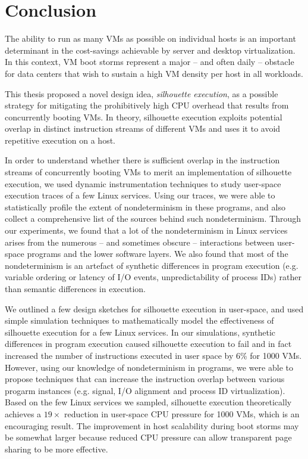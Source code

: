 \chapter{Conclusion} \label{ch:conc}
The ability to run as many VMs as possible
on individual hosts is an important determinant
in the cost-savings achievable
by server and desktop virtualization.
In this context, VM boot storms represent a major -- and often daily -- 
obstacle for data centers that wish to sustain a high VM density
per host in all workloads.

This thesis proposed a novel
design idea, {\em silhouette execution},
as a possible strategy for
mitigating the prohibitively high
CPU overhead that results from concurrently
booting VMs. In theory, silhouette execution 
exploits potential overlap in distinct instruction streams
of different VMs and uses it to avoid repetitive
execution on a host.

In order to understand whether
there is sufficient overlap in the instruction streams of
concurrently booting VMs to merit an implementation of 
silhouette execution, we used dynamic instrumentation 
techniques to study user-space execution traces of 
a few Linux services. Using our traces,
we were able to statistically profile
the extent of nondeterminism in these programs,
and also collect a comprehensive list of 
the sources behind such nondeterminism.
Through our experiments, we found that a
lot of the nondeterminism in Linux services
arises from the numerous -- and sometimes obscure --
interactions between user-space programs
and the lower software layers. We also
found that most of the nondeterminism
is an artefact of synthetic differences
in program execution (e.g. variable ordering
or latency of I/O events, unpredictability
of process IDs) rather than 
semantic differences in execution.

We outlined a few design sketches
for silhouette execution in user-space,
and used simple simulation techniques to
mathematically model the effectiveness of 
silhouette execution for a few Linux services. In
our simulations, synthetic differences in program execution
caused silhouette execution to fail and in fact
increased the number of instructions
executed in user space by 6\% for 1000 VMs.
However, using our knowledge of nondeterminism
in programs, we were able to propose
techniques that can increase
the instruction overlap 
between various progarm instances (e.g.
signal, I/O alignment and process ID virtualization).
Based on the few Linux services we sampled, silhouette execution
theoretically achieves a $19\times$ reduction
in user-space CPU pressure for 1000 VMs,
which is an encouraging result. 
The improvement in host scalability
during boot storms may be somewhat larger
because reduced CPU pressure can allow
transparent page sharing to be more
effective.

